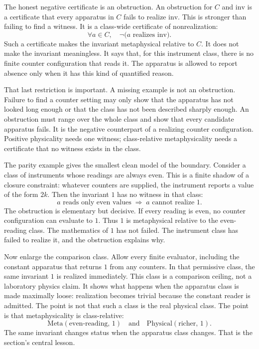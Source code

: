 The honest negative certificate is an obstruction. An obstruction for \(C\) and
\(\mathrm{inv}\) is a certificate that every apparatus in \(C\) fails to realize
\(\mathrm{inv}\). This is stronger than failing to find a witness. It is a
class-wide certificate of nonrealization:
\[
  \forall a \in C,\quad
  \neg\bigl(a \text{ realizes } \mathrm{inv}\bigr).
\]
Such a certificate makes the invariant metaphysical relative to \(C\). It does
not make the invariant meaningless. It says that, for this instrument class,
there is no finite counter configuration that reads it. The apparatus is allowed
to report absence only when it has this kind of quantified reason.

That last restriction is important. A missing example is not an obstruction.
Failure to find a counter setting may only show that the apparatus has not looked
long enough or that the class has not been described sharply enough. An
obstruction must range over the whole class and show that every candidate
apparatus fails. It is the negative counterpart of a realizing counter
configuration. Positive physicality needs one witness; class-relative
metaphysicality needs a certificate that no witness exists in the class.

The parity example gives the smallest clean model of the boundary. Consider a
class of instruments whose readings are always even. This is a finite shadow of
a closure constraint: whatever counters are supplied, the instrument reports a
value of the form \(2k\). Then the invariant \(1\) has no witness in that class:
\[
  a \text{ reads only even values}
  \;\Longrightarrow\;
  a \text{ cannot realize } 1.
\]
The obstruction is elementary but decisive. If every reading is even, no counter
configuration can evaluate to \(1\). Thus \(1\) is metaphysical relative to the
even-reading class. The mathematics of \(1\) has not failed. The instrument
class has failed to realize it, and the obstruction explains why.

Now enlarge the comparison class. Allow every finite evaluator, including the
constant apparatus that returns \(1\) from any counters. In that permissive
class, the same invariant \(1\) is realized immediately. This class is a
comparison ceiling, not a laboratory physics claim. It shows what happens when
the apparatus class is made maximally loose: realization becomes trivial because
the constant reader is admitted. The point is not that such a class is the real
physical class. The point is that metaphysicality is class-relative:
\[
  \mathrm{Meta}(\text{even-reading},\,1)
  \quad\text{and}\quad
  \mathrm{Physical}(\text{richer},\,1).
\]
The same invariant changes status when the apparatus class changes. That is the
section's central lesson.

